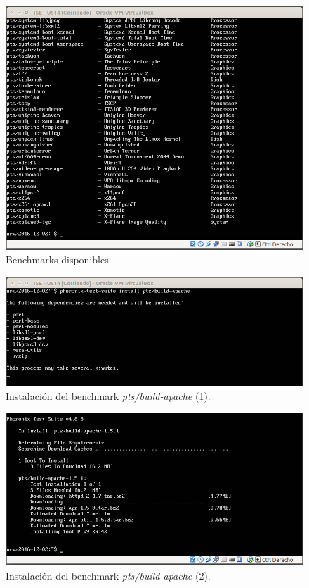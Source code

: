 \documentclass[a4paper,titlepage,12pt]{scrartcl}	%
\numberwithin{figure}{section} %
\numberwithin{table}{section} %
\begin{document}
	\begin{figure}[H]
		\includegraphics[width=\linewidth]{./Imagenes/1-2.png}
		\vspace{-0.5cm}
		\caption[Benchmarks disponibles.]{Benchmarks disponibles.}
		\label{1-2}
	\end{figure}
	
	\begin{figure}[H]
		\includegraphics[width=\linewidth]{./Imagenes/1-3.png}
		\vspace{-0.5cm}
		\caption[Instalación del benchmark \textit{pts/build-apache} (1).]{Instalación del benchmark \textit{pts/build-apache} (1).}
		\label{1-3}
	\end{figure}
	
	\begin{figure}[H]
		\includegraphics[width=\linewidth]{./Imagenes/1-4.png}
		\vspace{-0.5cm}
		\caption[Instalación del benchmark \textit{pts/build-apache} (2).]{Instalación del benchmark \textit{pts/build-apache} (2).}
		\label{1-4}
	\end{figure}
	
\end{document}
